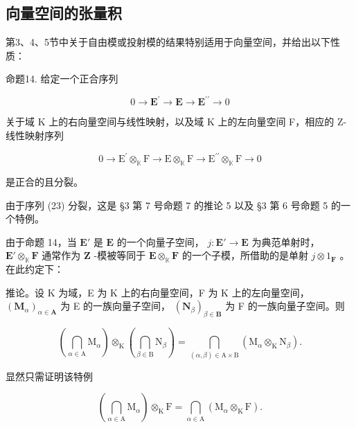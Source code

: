 \subsection{向量空间的张量积}

第3、4、5节中关于自由模或投射模的结果特别适用于向量空间，并给出以下性质：

命题14. 给定一个正合序列

\[
0 \rightarrow \mathbf {E} ^ {\prime} \rightarrow \mathbf {E} \rightarrow \mathbf {E} ^ {\prime \prime} \rightarrow 0\tag{23}
\]

关于域 K 上的右向量空间与线性映射，以及域 K 上的左向量空间 F，相应的 Z-线性映射序列

\[
0 \rightarrow \mathrm{E} ^ {\prime} \otimes_ {\mathbb {K}} \mathrm{F} \rightarrow \mathrm{E} \otimes_ {\mathbb {K}} \mathrm{F} \rightarrow \mathrm{E} ^ {\prime \prime} \otimes_ {\mathbb {K}} \mathrm{F} \rightarrow 0
\]

是正合的且分裂。

由于序列 (23) 分裂，这是 §3 第 7 号命题 7 的推论 5 以及 §3 第 6 号命题 5 的一个特例。

由于命题 14，当 \(\mathbf{E}'\) 是 \(\mathbf{E}\) 的一个向量子空间， \(j: \mathbf{E}' \to \mathbf{E}\) 为典范单射时， \(\mathbf{E}' \otimes_{\mathbb{K}} \mathbf{F}\) 通常作为 \(\mathbf{Z}\) -模被等同于 \(\mathbf{E} \otimes_{\mathbb{K}} \mathbf{F}\) 的一个子模，所借助的是单射 \(j \otimes 1_{\mathbf{F}}\) 。在此约定下：

推论。设 K 为域，E 为 K 上的右向量空间，F 为 K 上的左向量空间， \((\mathbf{M}_{\alpha})_{\alpha \in \mathbf{A}}\) 为 E 的一族向量子空间， \((\mathbf{N}_{\beta})_{\beta \in \mathbf{B}}\) 为 F 的一族向量子空间。则

\[
\left(\bigcap_ {\alpha \in \mathrm{A}} \mathrm{M} _ {\alpha}\right) \otimes_ {\mathrm{K}} \left(\bigcap_ {\beta \in \mathrm{B}} \mathrm{N} _ {\beta}\right) = \bigcap_ {(\alpha , \beta) \in \mathrm{A} \times \mathrm{B}} \left(\mathrm{M} _ {\alpha} \otimes_ {\mathrm{K}} \mathrm{N} _ {\beta}\right).\tag{24}
\]

显然只需证明该特例

\[
\left(\bigcap_ {\alpha \in \mathrm{A}} \mathrm{M} _ {\alpha}\right) \otimes_ {\mathrm{K}} \mathrm{F} = \bigcap_ {\alpha \in \mathrm{A}} \left(\mathrm{M} _ {\alpha} \otimes_ {\mathrm{K}} \mathrm{F}\right).\tag{25}
\]

